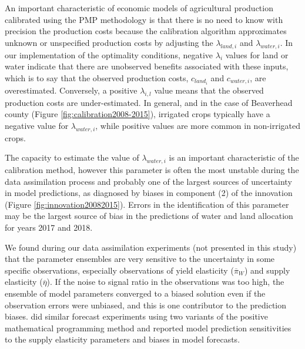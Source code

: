  An important characteristic of economic models of agricultural production calibrated using the PMP methodology is that there is no need to know with precision the production costs because the calibration algorithm approximates unknown or unspecified production costs by adjusting the $\lambda_{land,i}$ and $\lambda_{water,i}$. In our implementation of the optimality conditions, negative $\lambda_{i}$ values for land or water indicate that there are unobserved benefits associated with these inputs, which is to say that the observed production costs, $c_{land_i}$ and $c_{water,i}$, are overestimated. Conversely, a positive $\lambda_{i,l}$ value means that the observed production costs are under-estimated. In general, and in the case of Beaverhead county (Figure \ref{fig:calibration2008-2015}), irrigated crops typically have a negative value for $\lambda_{water,i}$, while positive values are more common in non-irrigated crops. 
 
 The capacity to estimate the value of $\lambda_{water,i}$ is an important characteristic of the calibration method, however this parameter is often the  most unstable during the data assimilation process and probably one of the largest sources of uncertainty in model predictions, as diagnosed by biases in component (2) of the innovation (Figure \ref{fig:innovation20082015}). Errors in the identification of this parameter may be the largest source of bias in the predictions of water and land allocation for years 2017 and 2018. 
 
 We found during our data assimilation experiments (not presented in this study) that the parameter ensembles are very sensitive to the uncertainty in some specific observations, especially observations of yield elasticity ($\overline{\pi}_W$) and supply elasticity ($\overline{\eta}$). If the noise to signal ratio in the observations was too high, the ensemble of model parameters converged to a biased solution even if the observation errors were unbiased, and this is one contributor to the prediction biases. \citet{Kanellopoulos2010} did similar forecast experiments using two variants of the positive mathematical programming method and reported model prediction sensitivities to the supply elasticity parameters and biases in model forecasts.  
 
